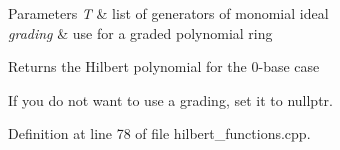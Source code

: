 \begin{DoxyParams}{Parameters}
{\em T} & list of generators of monomial ideal \\
\hline
{\em grading} & use for a graded polynomial ring \\
\hline
\end{DoxyParams}
\begin{DoxyReturn}{Returns}
the Hilbert polynomial for the 0-\/base case
\end{DoxyReturn}
If you do not want to use a grading, set it to {\ttfamily nullptr}. 

Definition at line 78 of file hilbert\+\_\+functions.\+cpp.

